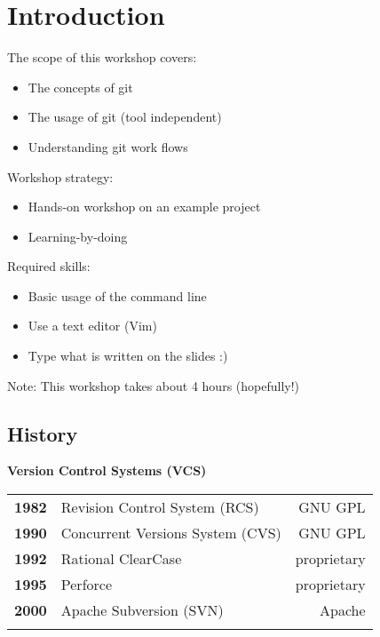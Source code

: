 \section{Introduction}
\begin{frame}
  \slidetitle
  The scope of this workshop covers:
  \begin{itemize}
    \item The concepts of git
    \item The usage of git (tool independent)
    \item Understanding git work flows
  \end{itemize}

  \pause
  \vspace{1em}
  Workshop strategy:
  \begin{itemize}
    \item Hands-on workshop on an example project
    \item Learning-by-doing
  \end{itemize}

  \pause
  \vspace{1em}
  Required skills:
  \begin{itemize}
    \item Basic usage of the command line
    \item Use a text editor (Vim)
    \item Type what is written on the slides :)
  \end{itemize}

  \vspace{1em}
  Note: This workshop takes about 4 hours (hopefully!)
\end{frame}

\subsection{History}
\begin{frame}
  \subslidetitle

  \textbf{Version Control Systems (VCS)}
  \pause
  \\
  \begin{tabular}{lp{6cm}r}
    \textbf{1982} & Revision Control System (RCS) & GNU GPL \\
    \pause
    \textbf{1990} & Concurrent Versions System (CVS) & GNU GPL \\
    \pause
    \textbf{1992} & Rational ClearCase & proprietary \\
    \pause
    \textbf{1995} & Perforce  & proprietary \\
    \pause
    \textbf{2000} & Apache Subversion (SVN)  & Apache \\
    \pause
  \end{tabular}
\end{frame}

